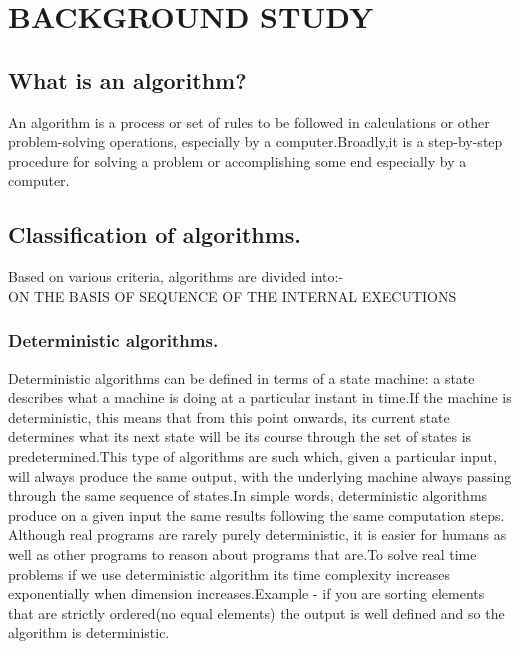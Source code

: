 \chapter{BACKGROUND STUDY}
\section{What is an algorithm?}An algorithm is a process or set of rules to be followed in calculations or other problem-solving operations, especially by a computer.Broadly,it is a step-by-step procedure for solving a problem or accomplishing some end especially by a computer.\\
\section{Classification of algorithms.}Based on various criteria, algorithms are divided into:-\\
ON THE BASIS OF SEQUENCE OF THE INTERNAL EXECUTIONS\\
\subsection{Deterministic algorithms.}Deterministic algorithms can be defined in terms of a state machine: a state	describes what a machine is doing at a particular instant in time.If the machine is deterministic, this means that from this point onwards, its current state determines what its next state will be its course through the set of states is predetermined.This type of algorithms are such which, given a particular input, will always 	produce the same output, with the underlying machine always passing through the same sequence of states.In simple words, deterministic algorithms produce on a given input the same results following the same computation steps.\\
Although real programs are rarely purely deterministic, it is easier for humans as 	well as other programs to reason about programs that are.To solve real time problems if we use deterministic algorithm its time complexity increases exponentially when dimension increases.Example - if you are sorting elements that are strictly ordered(no equal elements) the output is well defined and so the algorithm is deterministic.\\
